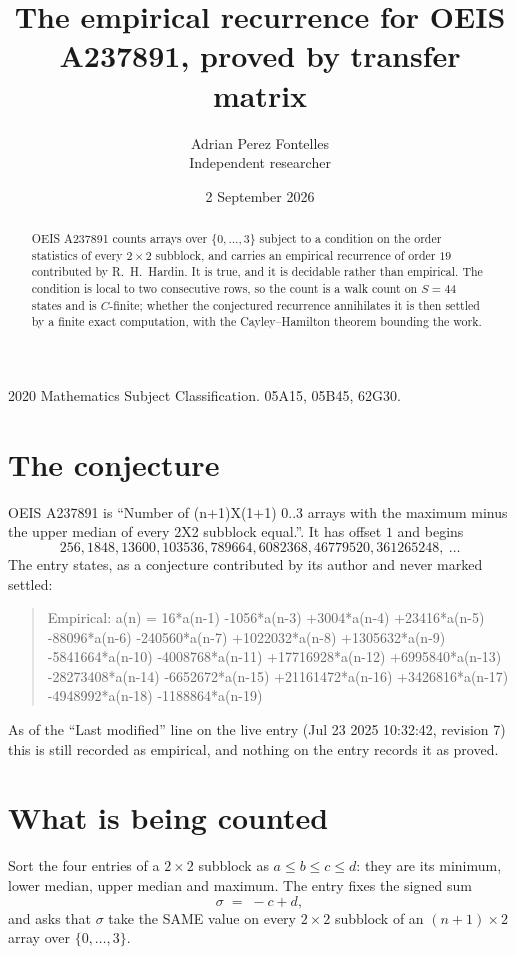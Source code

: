 \documentclass[11pt,a4paper]{article}
\title{The empirical recurrence for OEIS A237891, proved by transfer matrix}
\author{Adrian Perez Fontelles\\ \small Independent researcher}
\date{2 September 2026}
\theoremstyle{plain}
\theoremstyle{definition}
\begin{document}
\maketitle

\begin{abstract}
OEIS A237891 counts arrays over $\{0,\dots,3\}$ subject to a condition on the order
statistics of every $2\times2$ subblock, and carries an empirical recurrence of order
$19$ contributed by R.~H.~Hardin. It is true, and it is decidable rather than empirical.
The condition is local to two consecutive rows, so the count is a walk count on $S=44$
states and is $C$-finite; whether the conjectured recurrence annihilates it is then settled by
a finite exact computation, with the Cayley--Hamilton theorem bounding the work.
\end{abstract}

\noindent\small 2020 Mathematics Subject Classification. 05A15, 05B45, 62G30.\normalsize

\section{The conjecture}

OEIS A237891 is ``Number of (n+1)X(1+1) 0..3 arrays with the maximum minus the upper median of every 2X2 subblock equal.''. It has offset $1$ and begins
\[
256, 1848, 13600, 103536, 789664, 6082368, 46779520, 361265248,\ \dots
\]
The entry states, as a conjecture contributed by its author and never marked settled:
\begin{quote}
Empirical: a(n) = 16*a(n-1) -1056*a(n-3) +3004*a(n-4) +23416*a(n-5) -88096*a(n-6) -240560*a(n-7) +1022032*a(n-8) +1305632*a(n-9) -5841664*a(n-10) -4008768*a(n-11) +17716928*a(n-12) +6995840*a(n-13) -28273408*a(n-14) -6652672*a(n-15) +21161472*a(n-16) +3426816*a(n-17) -4948992*a(n-18) -1188864*a(n-19)
\end{quote}
As of the ``Last modified'' line on the live entry (Jul 23 2025 10:32:42, revision 7) this is still
recorded as empirical, and nothing on the entry records it as proved.

\section{What is being counted}

Sort the four entries of a $2\times2$ subblock as $a\le b\le c\le d$: they
are its minimum, lower median, upper median and maximum. The entry fixes the signed sum
\[
\sigma\;=\;-c+d,
\]
and asks that $\sigma$ take the SAME value on every $2\times2$ subblock of an
$(n+1)\times2$ array over $\{0,\dots,3\}$.
\end{document}
